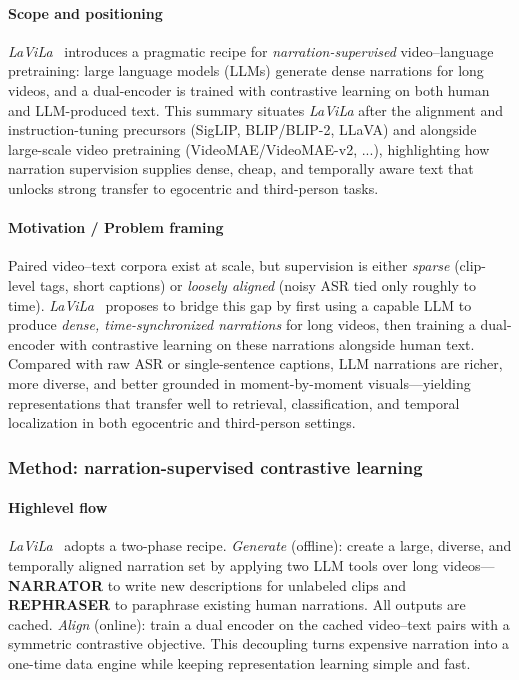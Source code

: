 \begin{enrichment}
\begin{enrichment}
        \paragraph{Scope and positioning}
        \emph{LaViLa}~\cite{zhao2022_lavila} introduces a pragmatic recipe for \emph{narration-supervised} video--language pretraining: large language models (LLMs) generate dense narrations for long videos, and a dual-encoder is trained with contrastive learning on both human and LLM-produced text. This summary situates \emph{LaViLa} after the alignment and instruction-tuning precursors (SigLIP, BLIP/BLIP-2, LLaVA) and alongside large-scale video pretraining (VideoMAE/VideoMAE-v2, ...), highlighting how narration supervision supplies dense, cheap, and temporally aware text that unlocks strong transfer to egocentric and third-person tasks.
        
        \paragraph{Motivation / Problem framing}
        Paired video–text corpora exist at scale, but supervision is either \emph{sparse} (clip-level tags, short captions) or \emph{loosely aligned} (noisy ASR tied only roughly to time). \emph{LaViLa}~\cite{zhao2022_lavila} proposes to bridge this gap by first using a capable LLM to produce \emph{dense, time-synchronized narrations} for long videos, then training a dual-encoder with contrastive learning on these narrations alongside human text. Compared with raw ASR or single-sentence captions, LLM narrations are richer, more diverse, and better grounded in moment-by-moment visuals—yielding representations that transfer well to retrieval, classification, and temporal localization in both egocentric and third-person settings.
        
        \subsubsection{Method: narration-supervised contrastive learning}
        \label{subsubsec:chapter24_lavila_method}
        
        \paragraph{Highlevel flow}
        \emph{LaViLa}~\cite{zhao2022_lavila} adopts a two\mbox{-}phase recipe. \emph{Generate} (offline): create a large, diverse, and temporally aligned narration set by applying two LLM tools over long videos—\textbf{NARRATOR} to write new descriptions for unlabeled clips and \textbf{REPHRASER} to paraphrase existing human narrations. All outputs are cached. \emph{Align} (online): train a dual encoder on the cached video–text pairs with a symmetric contrastive objective. This decoupling turns expensive narration into a one\mbox{-}time data engine while keeping representation learning simple and fast.
        

\end{enrichment}
\end{enrichment}
